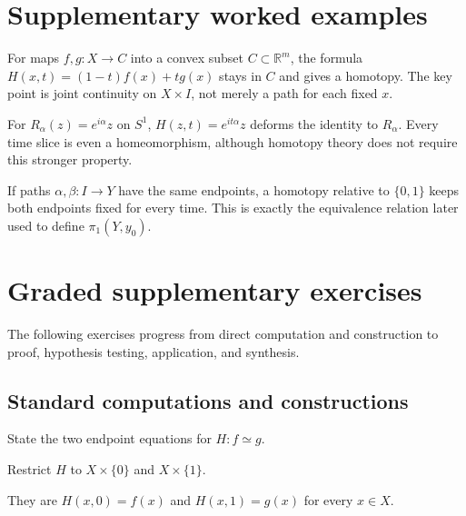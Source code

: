 \section{Supplementary worked examples}
\label{sec:viii01-pedagogy}

\begin{example}\label{ex:viii01-ped-01}
For maps $f,g:X\to C$ into a convex subset $C\subset\mathbb R^m$, the formula $H(x,t)=(1-t)f(x)+tg(x)$ stays in $C$ and gives a homotopy.  The key point is joint continuity on $X\times I$, not merely a path for each fixed $x$.
\end{example}

\begin{example}\label{ex:viii01-ped-02}
For $R_\alpha(z)=e^{i\alpha}z$ on $S^1$, $H(z,t)=e^{it\alpha}z$ deforms the identity to $R_\alpha$.  Every time slice is even a homeomorphism, although homotopy theory does not require this stronger property.
\end{example}

\begin{example}\label{ex:viii01-ped-03}
If paths $\alpha,\beta:I\to Y$ have the same endpoints, a homotopy relative to $\{0,1\}$ keeps both endpoints fixed for every time.  This is exactly the equivalence relation later used to define $\pi_1(Y,y_0)$.
\end{example}

\section{Graded supplementary exercises}
The following exercises progress from direct computation and construction to proof, hypothesis testing, application, and synthesis.

\subsection*{Standard computations and constructions}

\begin{exercise}\label{exr:viii01-ped-01}
State the two endpoint equations for $H:f\simeq g$.
\end{exercise}
\begin{hint}
Restrict $H$ to $X\times\{0\}$ and $X\times\{1\}$.
\end{hint}
\begin{solution}
They are $H(x,0)=f(x)$ and $H(x,1)=g(x)$ for every $x\in X$.
\end{solution}

